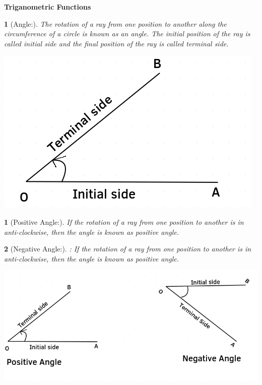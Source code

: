 \documentclass[12pt]{article}
\theoremstyle{colored}
\newtheorem*{defn}{}
\theoremstyle{subcolored}
\newtheorem*{subdefn}{}
\begin{document}
\begin{center}
  {\LARGE \textbf{Triganometric Functions}} \\
  
\end{center}
\begin{multicols}{2}

\begin{defn}[Angle:]The rotation of a ray from one position to
another along the circumference of a circle is
known as an angle. The initial position of the
ray is called initial side and the final position of
the ray is called terminal side.\\
\begin{center}
  \includegraphics[scale=0.25]{ff.png}
\end{center}

\end{defn}


\begin{subdefn}[Positive Angle:]
  If the rotation of a ray from
one position to another is in anti-clockwise,
then the angle is known as positive angle.\\
\end{subdefn} 

\begin{subdefn}[Negative Angle:]
  : If the rotation of a ray from
one position to another is in anti-clockwise,
then the angle is known as positive angle.

  
\end{subdefn}
\begin{center}
  \includegraphics[scale=0.25]{2.png}
\end{center}




\end{multicols}
\end{document}

